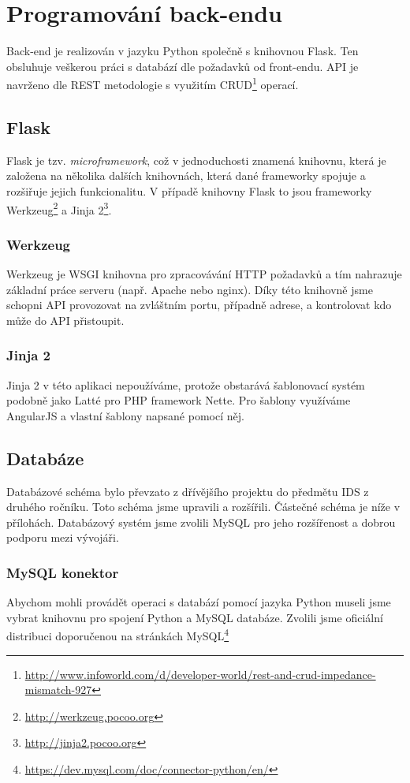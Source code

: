 \documentclass[11pt,a4paper]{article}
\begin{document}
\section*{Programování back-endu}
Back-end je realizován v jazyku Python společně s knihovnou Flask. Ten obsluhuje veškerou práci s databází dle požadavků od front-endu. API je navrženo dle REST metodologie\cite{rest} s využitím CRUD\footnote{\url{http://www.infoworld.com/d/developer-world/rest-and-crud-impedance-mismatch-927}} operací.

\subsection*{Flask}
Flask je tzv. {\em microframework}, což v jednoduchosti znamená knihovnu, která je založena na několika dalších knihovnách, která dané frameworky spojuje a rozšiřuje jejich funkcionalitu. V případě knihovny Flask to jsou frameworky Werkzeug\footnote{\url{http://werkzeug.pocoo.org}} a Jinja 2\footnote{\url{http://jinja2.pocoo.org}}.

\subsubsection*{Werkzeug}
Werkzeug je WSGI knihovna pro zpracovávání HTTP požadavků a tím nahrazuje základní práce serveru (např. Apache nebo nginx). Díky této knihovně jsme schopni API provozovat na zvláštním portu, případně adrese, a kontrolovat kdo může do API přistoupit.

\subsubsection*{Jinja 2}
Jinja 2 v této aplikaci nepoužíváme, protože obstarává šablonovací systém podobně jako Latté pro PHP framework Nette. Pro šablony využíváme AngularJS a vlastní šablony napsané pomocí něj.

\subsection*{Databáze}
Databázové schéma bylo převzato z dřívějšího projektu do předmětu IDS z druhého ročníku. Toto schéma jsme upravili a rozšířili. Částečné schéma je níže v přílohách. Databázový systém jsme zvolili MySQL pro jeho rozšířenost a dobrou podporu mezi vývojáři.

\subsubsection*{MySQL konektor}
Abychom mohli provádět operaci s databází pomocí jazyka Python museli jsme vybrat knihovnu pro spojení Python a MySQL databáze. Zvolili jsme oficiální distribuci doporučenou na stránkách MySQL\footnote{\url{https://dev.mysql.com/doc/connector-python/en/}}
\end{document}
